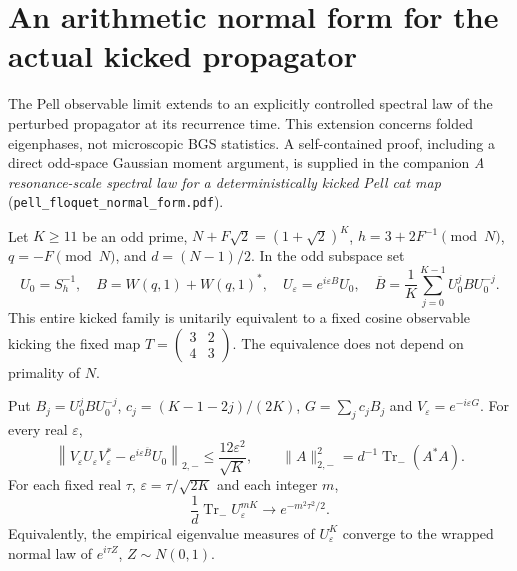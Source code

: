 \section{An arithmetic normal form for the actual kicked propagator}
\label{sec:pell-floquet}
The Pell observable limit extends to an explicitly controlled spectral law
of the perturbed propagator at its recurrence time. This extension concerns
folded eigenphases, not microscopic BGS statistics. A self-contained proof,
including a direct odd-space Gaussian moment argument, is supplied in the
companion \emph{A resonance-scale spectral law for a deterministically kicked
Pell cat map} (\texttt{pell\_floquet\_normal\_form.pdf}).

Let $K\geq11$ be an odd prime, $N+F\sqrt2=(1+\sqrt2)^K$,
$h=3+2F^{-1}\pmod N$, $q=-F\pmod N$, and $d=(N-1)/2$. In the odd subspace set
\[
 U_0=S_h^{-1},\quad B=W(q,1)+W(q,1)^*,\quad
 U_\varepsilon=e^{i\varepsilon B}U_0,\quad
 \overline B=\frac1K\sum_{j=0}^{K-1}U_0^jBU_0^{-j}.
\]
This entire kicked family is unitarily equivalent to a fixed cosine
observable kicking the fixed map $T=\left(\begin{smallmatrix}3&2\\4&3\end{smallmatrix}\right)$.
The equivalence does not depend on primality of $N$.

\begin{theorem}
Put $B_j=U_0^jBU_0^{-j}$,
$c_j=(K-1-2j)/(2K)$, $G=\sum_jc_jB_j$ and
$V_\varepsilon=e^{-i\varepsilon G}$. For every real $\varepsilon$,
\[
 \left\|V_\varepsilon U_\varepsilon V_\varepsilon^*
               -e^{i\varepsilon\overline B}U_0\right\|_{2,-}
       \leq\frac{12\varepsilon^2}{\sqrt K},
 \qquad \|A\|_{2,-}^2=d^{-1}\operatorname{Tr}_{-}(A^*A).
\]
For each fixed real $\tau$, $\varepsilon=\tau/\sqrt{2K}$ and each integer $m$,
\[
 \frac1d\operatorname{Tr}_{-}U_\varepsilon^{mK}
       \longrightarrow e^{-m^2\tau^2/2}.
\]
Equivalently, the empirical eigenvalue measures of $U_\varepsilon^K$
converge to the wrapped normal law of $e^{i\tau Z}$, $Z\sim N(0,1)$.
\end{theorem}

